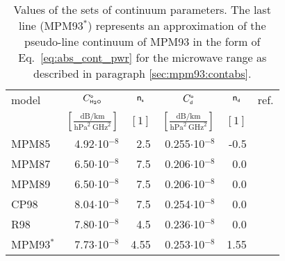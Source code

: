 {\begin{table}[!hb]
  \begin{center}
  \begin{tabular}{lrrrrr}
    \hline
    model  & \multicolumn{1}{c}{$C^{\mbox{\tiny \sf o}}_{\mbox{\tiny \sf H}_{2}\mbox{\tiny \sf O}}$} & 
             \multicolumn{1}{c}{${\sf n}_{\mbox{\tiny \sf s}}$}  & 
             \multicolumn{1}{c}{$C^{\mbox{\tiny \sf o}}_{\mbox{\tiny \sf d}}$} & 
             \multicolumn{1}{c}{${\sf n}_{\mbox{\tiny \sf d}}$}  & 
             ref.\\
           & \multicolumn{1}{c}{$\left[\frac{\mbox{dB/km}}
                               {\mbox{hPa}^2~\mbox{GHz}^2}\right]$} & 
             \multicolumn{1}{c}{$[1]$} & 
             \multicolumn{1}{c}{$\left[\frac{\mbox{dB/km}}
                               {\mbox{hPa}^2~\mbox{GHz}^2}\right]$} & 
             \multicolumn{1}{c}{$[1]$} & \\
    \hline
    MPM85  & 4.92$\cdot$10$^{-8}$ & 2.5 & 0.255$\cdot$10$^{-8}$  & -0.5 & \cite{liebe:84}\\
    MPM87  & 6.50$\cdot$10$^{-8}$ & 7.5 & 0.206$\cdot$10$^{-8}$  & 0.0 & \cite{liebeandlayton:87}\\
    MPM89  & 6.50$\cdot$10$^{-8}$ & 7.5 & 0.206$\cdot$10$^{-8}$  & 0.0 & \cite{liebe:89}\\
    CP98   & 8.04$\cdot$10$^{-8}$ & 7.5 & 0.254$\cdot$10$^{-8}$ & 0.0 & \cite{cruzpol:98}\\ 
    R98    & 7.80$\cdot$10$^{-8}$ & 4.5 & 0.236$\cdot$10$^{-8}$  & 0.0 & \cite{pwr:98}\\
    \hline
    MPM93$^*$ & 7.73$\cdot$10$^{-8}$ & 4.55 & 0.253$\cdot$10$^{-8}$  & 1.55 & \cite{liebeetal:93}\\
    \hline
 \end{tabular}
\end{center}
 \caption{Values of the sets of continuum parameters. The last line (MPM93$^*$)
   represents an approximation of the pseudo-line continuum of MPM93
   in the form of Eq.~\ref{eq:abs_cont_pwr} for the microwave range as
   described in paragraph \ref{sec:mpm93:contabs}.}
 \label{tab:wvcontparam}
\end{table}
%
%
%
%
\label{leveld:h2o_ContMod}
%
%
%
% 
%
%
%
% 
\label{leveld:o2_pwr98_cont}
%
}
